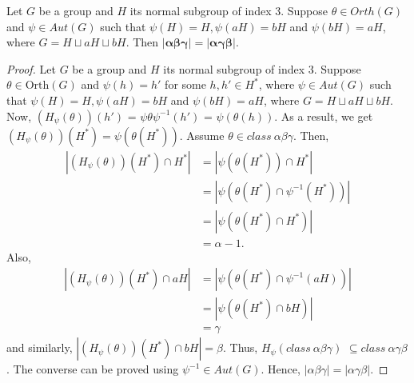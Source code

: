 \documentclass[10pt,a4paper]{amsart}
\begin{document}
	\begin{lemma}\label{le3}
		Let $G$ be a group and $H$ its normal subgroup of index 3. Suppose $\theta \in Orth(G)$ and $\psi \in Aut(G)$ such that $\psi(H) = H, \psi(aH) = bH$ and $\psi(bH) = aH$, where $G = H \sqcup aH \sqcup bH.$ Then  $\bm{|\alpha \beta \gamma| = |\alpha \gamma \beta|}$.
	\end{lemma}

	\begin{proof}
		Let $G$ be a group and $H$ its normal subgroup of index $3$. Suppose $\theta \in \text{Orth}(G)$ and $\psi(h) = h'$ for some $h,h' \in H^{\ast}$, where $\psi \in Aut(G)$ such that $\psi(H) = H, \psi(aH) = bH$ and $\psi(bH) = aH$, where $G = H \sqcup aH \sqcup bH.$ Now, $(H_{\psi}(\theta))(h')$ = $\psi \theta \psi^{-1}(h')$ = $\psi (\theta(h))$. As a result, we get $(H_{\psi}(\theta))(H^{\ast}) = \psi(\theta(H^{\ast}))$. 		
		 Assume $\theta \in class~\alpha \beta \gamma$. Then, 
		 \begin{align*}
		 	|(H_{\psi}(\theta))(H^{\ast})\cap H^{\ast}|
		 	& =|\psi(\theta(H^{\ast})) \cap H^{\ast}|\\
		 	  &=|\psi(\theta(H^{\ast})\cap \psi^{-1}(H^{\ast}))| \\ &=|\psi(\theta(H^{\ast})\cap H^{\ast})|\\& = \alpha - 1.
		 \end{align*} 
		   Also, 
		   \begin{align*}
		   |(H_{\psi}(\theta))(H^{\ast})\cap aH| &= |\psi(\theta(H^{\ast})\cap \psi^{-1}(aH))|\\& = |\psi(\theta(H^{\ast}) \cap bH)|\\& = \gamma
		\end{align*}
		     and similarly, $|(H_{\psi}(\theta))(H^{\ast})\cap bH|=\beta$.
		     Thus, $H_{\psi}(class~\alpha \beta \gamma)$ $ \subseteq class~\alpha \gamma \beta$.
		      The converse can be proved using $\psi^{-1} \in Aut(G)$. Hence, $|\alpha \beta \gamma| = |\alpha \gamma \beta|.$
	\end{proof}
\end{document}
